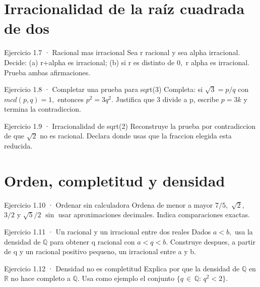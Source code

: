 \documentclass[10pt,a4paper,oneside,openany]{book}
\begin{document}
\section{Irracionalidad de la raíz cuadrada de dos}
\begin{PSevenExerciseFixed}{Ejercicio 1.7 · Racional mas irracional}
Sea r racional y sea alpha irracional. Decide: (a) r+alpha es irracional; (b) si r es distinto de \(0,\) r alpha es irracional. Prueba ambas afirmaciones.
\end{PSevenExerciseFixed}
\begin{PSevenExerciseFixed}{Ejercicio 1.8 · Completar una prueba para sqrt(3)}
Completa: si \(\sqrt{3}=p/q\) con \(mcd(p,q)=1,\) entonces \(p^{2}=3q^{2}\). Justifica que \(3\) divide a p, escribe \(p=3k\) y termina la contradiccion.
\end{PSevenExerciseFixed}
\begin{PSevenExerciseFixed}{Ejercicio 1.9 · Irracionalidad de sqrt(2)}
Reconstruye la prueba por contradiccion de que \(\sqrt{2}\) no es racional. Declara donde usas que la fraccion elegida esta reducida.
\end{PSevenExerciseFixed}
\section{Orden, completitud y densidad}
\begin{PSevenExerciseFixed}{Ejercicio 1.10 · Ordenar sin calculadora}
Ordena de menor a mayor \(7/5,\) \(\sqrt{2},\) \(3/2\) y \(\sqrt{5}/2\) \(\sin\) usar aproximaciones decimales. Indica comparaciones exactas.
\end{PSevenExerciseFixed}
\begin{PSevenExerciseFixed}{Ejercicio 1.11 · Un racional y un irracional entre dos reales}
Dados \(a<b,\) usa la densidad de \(\mathbb{Q}\) para obtener q racional con \(a<q<b\). Construye despues, a partir de q y un racional positivo pequeno, un irracional entre a y b.
\end{PSevenExerciseFixed}
\begin{PSevenExerciseFixed}{Ejercicio 1.12 · Densidad no es completitud}
Explica por que la densidad de \(\mathbb{Q}\) en \(\mathbb{R}\) no hace completo a \(\mathbb{Q}\). Usa como ejemplo el conjunto \(\{q\,\in \,\mathbb{Q}:\,q^{2}<2\}\).
\end{PSevenExerciseFixed}
\end{document}
